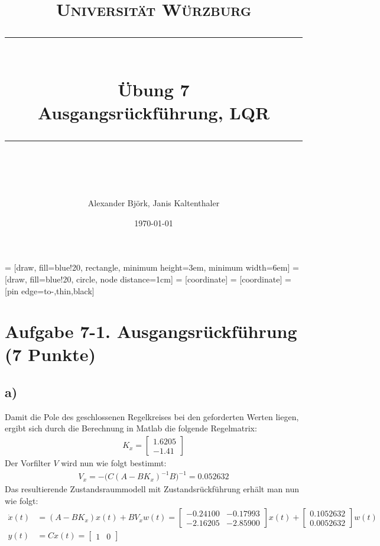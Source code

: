 \documentclass[11pt]{scrartcl} %
\title{	
	\normalfont\normalsize
	\textsc{Universität Würzburg}\\ %
	\vspace{25pt} %
	\rule{\linewidth}{0.5pt}\\ %
	\vspace{20pt} %
	{\huge Übung 7}\\ %
	{\Large Ausgangsrückführung, LQR}\\
	\vspace{12pt} %
	\rule{\linewidth}{2pt}\\ %
	\vspace{12pt} %
}
\author{\LARGE Alexander Björk, Janis Kaltenthaler} %
\date{\normalsize\today} %
\begin{document}
\maketitle %

 = [draw, fill=blue!20, rectangle, 
    minimum height=3em, minimum width=6em]
 = [draw, fill=blue!20, circle, node distance=1cm]
 = [coordinate]
 = [coordinate]
 = [pin edge={to-,thin,black}]
\newcommand{\inte}{$\displaystyle \int$}

\section*{Aufgabe 7-1. Ausgangsrückführung (7 Punkte)}
\subsection*{a)}
Damit die Pole des geschlossenen Regelkreises bei den geforderten Werten liegen, ergibt sich durch die Berechnung in Matlab die folgende Regelmatrix:
\begin{align*}
	K_x=\begin{bmatrix}1.6205\\-1.41\end{bmatrix}
\end{align*}
Der Vorfilter $V$ wird nun wie folgt bestimmt:
\begin{align*}
	V_x=-\bigl(C(A-BK_x)^{-1}B\bigr)^{-1}=0.052632
\end{align*}
Das resultierende Zustandsraummodell mit Zustandsrückführung erhält man nun wie folgt:
\begin{align*}
	\dot{x}(t)&=(A-BK_x)x(t)+BV_xw(t)=\begin{bmatrix}-0.24100&-0.17993\\-2.16205&-2.85900\end{bmatrix}x(t)+\begin{bmatrix}0.1052632\\0.0052632\end{bmatrix}w(t)\\
	y(t)&=Cx(t)=\begin{bmatrix}1&0\end{bmatrix}
\end{align*}
\end{document}

